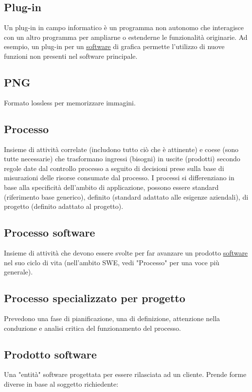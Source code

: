	\subsection{Plug-in}
	\label{sec:plug-in}
	Un plug-in in campo informatico è un programma non autonomo che interagisce con un altro programma per ampliarne o estenderne le funzionalità originarie. Ad esempio, un plug-in per un \underline{\hyperref[sec:prodottosoftware]{software}} di grafica permette l'utilizzo di nuove funzioni non presenti nel software principale.


	\subsection{PNG}
	\label{sec:png}	
	Formato lossless per memorizzare immagini.

	
	\subsection{Processo}
	\label{sec:processi}
	Insieme di attività correlate (includono tutto ciò che è attinente) e coese (sono tutte necessarie) che trasformano ingressi (bisogni) in uscite (prodotti) secondo regole date dal controllo processo a seguito di decisioni prese sulla base di misurazioni delle risorse consumate dal processo.
	I processi si differenziano in base alla specificità dell'ambito di applicazione, possono essere standard (riferimento base generico), definito (standard adattato alle esigenze aziendali), di progetto (definito adattato al progetto).

	
	\subsection{Processo software}
	\label{sec:processisoftware}
	Insieme di attività che devono essere svolte per far avanzare un prodotto \underline{\hyperref[sec:prodottosoftware]{software}} nel suo ciclo di vita (nell'ambito SWE, vedi "Processo" per una voce più generale).

	
	\subsection{Processo specializzato per progetto}
	\label{sec:processispecializzati}
	Prevedono una fase di pianificazione, una di definizione, attenzione nella conduzione e analisi critica del funzionamento del processo.

	
	\subsection{Prodotto software}
	\label{sec:prodottosoftware}
	Una "entità" software progettata per essere rilasciata ad un cliente.
	Prende forme diverse in base al soggetto richiedente:


